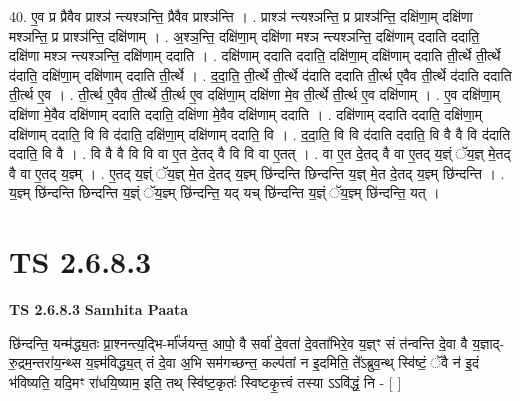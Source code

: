 \documentclass[17pt]{extarticle}
\begin{document}
40. ए॒व प्र प्रैवैव प्राश्ञ॑ न्त्यश्ञन्ति॒ प्रैवैव प्राश्ञ॑न्ति । . प्राश्ञ॑ न्त्यश्ञन्ति॒ प्र प्राश्ञ॑न्ति॒ दक्षि॑णा॒म् दक्षि॑णा मश्ञन्ति॒ प्र प्राश्ञ॑न्ति॒ दक्षि॑णाम् । . अ॒श्ञ॒न्ति॒ दक्षि॑णा॒म् दक्षि॑णा मश्ञ न्त्यश्ञन्ति॒ दक्षि॑णाम् ददाति ददाति॒ दक्षि॑णा मश्ञ न्त्यश्ञन्ति॒ दक्षि॑णाम् ददाति । . दक्षि॑णाम् ददाति ददाति॒ दक्षि॑णा॒म् दक्षि॑णाम् ददाति ती॒र्त्थे ती॒र्त्थे द॑दाति॒ दक्षि॑णा॒म् दक्षि॑णाम् ददाति ती॒र्त्थे । . द॒दा॒ति॒ ती॒र्त्थे ती॒र्त्थे द॑दाति ददाति ती॒र्त्थ ए॒वैव ती॒र्त्थे द॑दाति ददाति ती॒र्त्थ ए॒व । . ती॒र्त्थ ए॒वैव ती॒र्त्थे ती॒र्त्थ ए॒व दक्षि॑णा॒म् दक्षि॑णा मे॒व ती॒र्त्थे ती॒र्त्थ ए॒व दक्षि॑णाम् । . ए॒व दक्षि॑णा॒म् दक्षि॑णा मे॒वैव दक्षि॑णाम् ददाति ददाति॒ दक्षि॑णा मे॒वैव दक्षि॑णाम् ददाति । . दक्षि॑णाम् ददाति ददाति॒ दक्षि॑णा॒म् दक्षि॑णाम् ददाति॒ वि वि द॑दाति॒ दक्षि॑णा॒म् दक्षि॑णाम् ददाति॒ वि । . द॒दा॒ति॒ वि वि द॑दाति ददाति॒ वि वै वै वि द॑दाति ददाति॒ वि वै । . वि वै वै वि वि वा ए॒त दे॒तद् वै वि वि वा ए॒तत् । . वा ए॒त दे॒तद् वै वा ए॒तद् य॒ज्ञ्ं ॅय॒ज्ञ् मे॒तद् वै वा ए॒तद् य॒ज्ञ्म् । . ए॒तद् य॒ज्ञ्ं ॅय॒ज्ञ् मे॒त दे॒तद् य॒ज्ञ्म् छि॑न्दन्ति छिन्दन्ति य॒ज्ञ् मे॒त दे॒तद् य॒ज्ञ्म् छि॑न्दन्ति । . य॒ज्ञ्म् छि॑न्दन्ति छिन्दन्ति य॒ज्ञ्ं ॅय॒ज्ञ्म् छि॑न्दन्ति॒ यद् यच् छि॑न्दन्ति य॒ज्ञ्ं ॅय॒ज्ञ्म् छि॑न्दन्ति॒ यत् । \newline
\pagebreak
{}

\section{ TS 2.6.8.3 }

\textbf{TS 2.6.8.3 } \newline
\textbf{Samhita Paata} \newline

छि॑न्दन्ति॒ यन्म॑द्ध्य॒तः प्रा॒श्नन्त्य॒द्भि-र्मा᳚र्जयन्त॒ आपो॒ वै सर्वा॑ दे॒वता॑ दे॒वता॑भिरे॒व य॒ज्ञ्ꣳ सं त॑न्वन्ति दे॒वा वै य॒ज्ञाद्-रु॒द्रम॒न्तरा॑य॒न्थ्स य॒ज्ञ्म॑विद्ध्य॒त् तं दे॒वा अ॒भि सम॑गच्छन्त॒ कल्प॑तां न इ॒दमिति॒ ते᳚ऽब्रुव॒न्थ् स्वि॑ष्टं॒ ॅवै न॑ इ॒दं भ॑विष्यति॒ यदि॒मꣳ रा॑धयि॒ष्याम॒ इति॒ तथ् स्वि॑ष्ट॒कृतः॑ स्विष्टकृ॒त्त्वं तस्या ऽऽवि॑द्धं॒ नि - [  ] \newline
\end{document}
